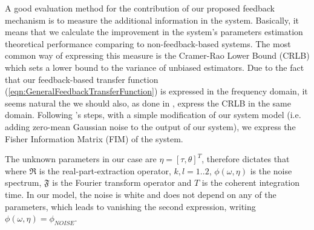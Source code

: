 A good evaluation method for the contribution of our proposed feedback mechanism is to measure the additional information in the system. Basically, it means that we calculate the improvement in the system's parameters estimation theoretical performance comparing to non-feedback-based systems. The most common way of expressing this measure is the Cramer-Rao Lower Bound (CRLB) which sets a lower bound to the variance of unbiased estimators. Due to the fact that our feedback-based transfer function (\ref{eqn:GeneralFeedbackTransferFunction}) is expressed in the frequency domain, it seems natural the we should also, as done in \cite{ARIELAZEIRAANDARYENEHORAIFrequencyProcesses}, express the CRLB in the same domain. Following \cite{ARIELAZEIRAANDARYENEHORAIFrequencyProcesses}'s steps, with a simple modification of our system model (i.e. adding zero-mean Gaussian noise to the output of our system), we express the Fisher Information Matrix (FIM) of the system.
\par The unknown parameters in our case are $ \eta = [\tau,\theta]^{T} $, therefore \cite{ARIELAZEIRAANDARYENEHORAIFrequencyProcesses} dictates that
where $\Re$ is the real-part-extraction operator, $k,l = 1..2$, $\phi\left(\omega,\eta\right)$ is the noise spectrum, $\mathfrak{F}$ is the Fourier transform operator and $T$ is the coherent integration time. In our model, the noise is white and does not depend on any of the parameters, which leads to vanishing the second expression, writing $\phi\left(\omega,\eta\right) = \phi_{NOISE}$. 
